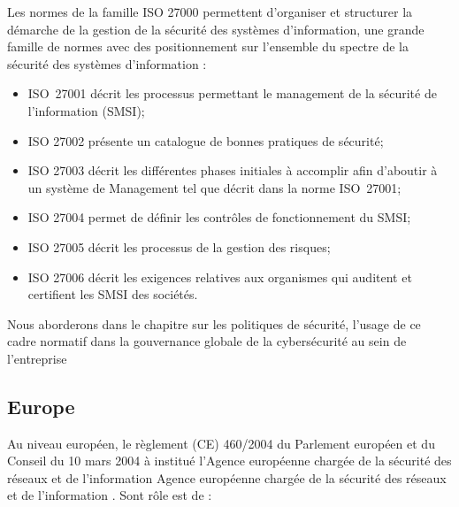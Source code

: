 Les normes de la famille ISO 27000 permettent d’organiser et structurer la démarche de la gestion de la sécurité des systèmes d’information, une grande famille de normes avec des  positionnement sur l'ensemble du spectre  de la sécurité des systèmes d'information : 

\begin{itemize}
  \item ISO~27001 décrit les processus permettant le management de la sécurité de l’information (SMSI);
  \item ISO 27002 présente un catalogue de bonnes pratiques de sécurité;
  \item ISO 27003 décrit les différentes phases initiales à accomplir afin d’aboutir à un système de Management tel que décrit dans la norme ISO~27001;
  \item ISO 27004 permet de définir les contrôles de fonctionnement du SMSI;
  \item ISO 27005 décrit les processus de la gestion des risques;
  \item ISO 27006 décrit les exigences relatives aux organismes qui auditent et certifient les SMSI des sociétés.
\end{itemize}

Nous aborderons dans le chapitre sur les politiques de sécurité, l'usage de ce cadre normatif dans la gouvernance globale de la cybersécurité au sein de l'entreprise


\subsection{Europe}

Au niveau européen, le règlement (CE) 460/2004 du Parlement européen et du Conseil du 10 mars 2004 à institué l'Agence européenne chargée de la sécurité des réseaux et de l'information  Agence européenne chargée de la sécurité des réseaux et de l'information . Sont rôle est de : 


